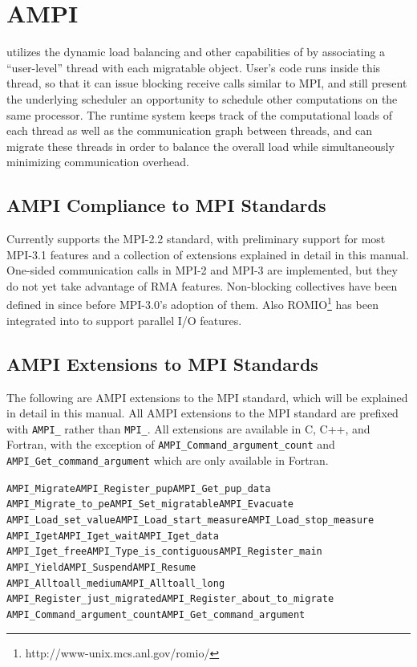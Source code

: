 \documentclass[10pt]{article}
\begin{document}
\section{AMPI}

\ampi{} utilizes the dynamic load balancing and other capabilities of \charmpp{} by
associating a ``user-level'' thread with each \charmpp{} migratable object.
User's code runs inside this thread, so that it can issue blocking receive
calls similar to MPI, and still present the underlying scheduler an opportunity
to schedule other computations on the same processor. The runtime system keeps
track of the computational loads of each thread as well as the communication graph
between \ampi{} threads, and can migrate these threads in order to balance the
overall load while simultaneously minimizing communication overhead.

\subsection{AMPI Compliance to MPI Standards}

Currently \ampi{} supports the MPI-2.2 standard, with preliminary support for most MPI-3.1
features and a collection of extensions explained in detail in this manual. One-sided
communication calls in MPI-2 and MPI-3 are implemented, but they do not yet
take advantage of RMA features. Non-blocking collectives have been defined in
\ampi{} since before MPI-3.0's adoption of them. Also
ROMIO\footnote{http://www-unix.mcs.anl.gov/romio/} has been integrated into
\ampi{} to support parallel I/O features.

\subsection{AMPI Extensions to MPI Standards}

The following are AMPI extensions to the MPI standard, which will be explained in
detail in this manual. All AMPI extensions to the MPI standard are prefixed with
\texttt{AMPI\_} rather than \texttt{MPI\_}. All extensions are available in C, C++, and Fortran,
with the exception of \texttt{AMPI\_Command\_argument\_count} and
\texttt{AMPI\_Get\_command\_argument} which are only available in Fortran.

\begin{alltt}
AMPI_Migrate          AMPI_Register_pup            AMPI_Get_pup_data
AMPI_Migrate_to_pe    AMPI_Set_migratable          AMPI_Evacuate
AMPI_Load_set_value   AMPI_Load_start_measure      AMPI_Load_stop_measure
AMPI_Iget             AMPI_Iget_wait               AMPI_Iget_data
AMPI_Iget_free        AMPI_Type_is_contiguous      AMPI_Register_main
AMPI_Yield            AMPI_Suspend                 AMPI_Resume
AMPI_Alltoall_medium  AMPI_Alltoall_long
AMPI_Register_just_migrated         AMPI_Register_about_to_migrate
AMPI_Command_argument_count         AMPI_Get_command_argument
\end{alltt}
\end{document}
